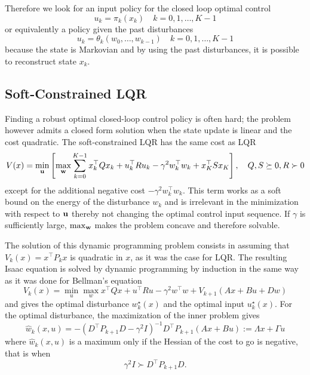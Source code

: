 Therefore we look for an input policy for the closed loop optimal control
\begin{equation*}
  u_k = \pi_k(x_k)\quad k=0,1,\ldots, K-1
\end{equation*}
or equivalently a policy given the past disturbances
\begin{equation*}
  u_k = \theta_k(w_0,\ldots,w_{k-1})\quad k=0,1,\ldots, K-1
\end{equation*}
because the state is Markovian and by using the past disturbances, it is possible to reconstruct state $x_k$.

\subsection{Soft-Constrained LQR}
\label{sec:soft-constrained-lqr}

Finding a robust optimal closed-loop control policy is often hard; the problem however admits a closed form solution when the state update is linear and the cost quadratic. The soft-constrained LQR has the same cost as LQR
\begin{equation*}
  V(x) = \min_{\boldsymbol{\mathrm{u}}} \left[\max_{\boldsymbol{\mathrm{w}}} \sum_{k=0}^{K-1} x_k^\top Qx_k + u_k^\top R u_k - \gamma^2 w_k^\top w_k + x_K^\top Sx_K\right],\quad Q,S\succeq 0, R\succ 0
\end{equation*}
except for the additional negative cost $-\gamma^2 w_k^\top w_k$. This term works as a soft bound on the energy of the disturbance $w_k$ and is irrelevant in the minimization with respect to $\boldsymbol{\mathrm{u}}$ thereby not changing the optimal control input sequence. If $\gamma$ is sufficiently large, $\max_{\boldsymbol{\mathrm{w}}}$ makes the problem concave and therefore solvable.

The solution of this dynamic programming problem consists in assuming that $V_k(x) = x^\top P_kx$ is quadratic in $x$, as it was the case for LQR. The resulting Isaac equation is solved by dynamic programming by induction in the same way as it was done for Bellman's equation
\begin{equation*}
  V_k(x) = \min_u \max_w x^\top Qx + u^\top Ru - \gamma^2 w^\top w + V_{k+1}(Ax+Bu+Dw)
\end{equation*}
and gives the optimal disturbance $w_k^\star(x)$ and the optimal input $u_k^\star(x)$. For the optimal disturbance, the maximization of the inner problem gives
\begin{equation*}
  \hat{w}_k(x,u) = -(D^\top P_{k+1}D-\gamma^2I)^{-1}D^\top P_{k+1} (Ax+Bu) := \Lambda x + \Gamma u
\end{equation*}
where $\hat{w}_k(x,u)$ is a maximum only if the Hessian of the cost to go is negative, that is when
\begin{equation*}
  \gamma^2 I \succ D^\top P_{k+1}D.
\end{equation*}

